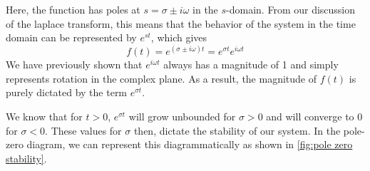 Here, the function has poles at $s=\sigma\pm i\omega$ in the $s$-domain. From our discussion of the \gls{laplace transform}, this means that the behavior of the system in the time domain can be represented by  $e^{st}$, which gives
$$f(t)=e^{(\sigma\pm i\omega)t}=e^{\sigma t}e^{i\omega t}$$
We have previously shown that $e^{i\omega t}$ always has a magnitude of 1 and simply represents rotation in the complex plane. As a result, the magnitude of $f(t)$ is purely dictated by the term $e^{\sigma t}$.

We know that for $t>0$, $e^{\sigma t}$ will grow unbounded for $\sigma >0$ and will converge to $0$ for $\sigma < 0$. These values for $\sigma$ then, dictate the stability of our system. In the pole-zero diagram, we can represent this diagrammatically as shown in \autoref{fig:pole zero stability}.
\begin{figure}
    \centering
 
\tikzset{
pattern size/.store in=\mcSize, 
pattern size = 5pt,
pattern thickness/.store in=\mcThickness, 
pattern thickness = 0.3pt,
pattern radius/.store in=\mcRadius, 
pattern radius = 1pt}
\makeatletter
{}
\makeatother

 
\tikzset{
pattern size/.store in=\mcSize, 
pattern size = 5pt,
pattern thickness/.store in=\mcThickness, 
pattern thickness = 0.3pt,
pattern radius/.store in=\mcRadius, 
pattern radius = 1pt}
\makeatletter
{}
\makeatother
{} %

\begin{tikzpicture}[x=0.75pt,y=0.75pt,yscale=-1,xscale=1]


\end{tikzpicture}
\end{figure}
